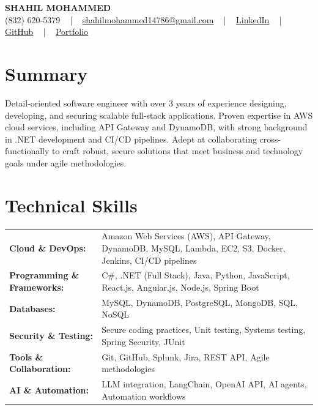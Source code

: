\documentclass[letterpaper,11pt]{article}
\begin{document}
\begin{center}
    {\fontsize{14pt}{12pt}\selectfont \textbf{\MakeUppercase{Shahil Mohammed}}}\\ \vspace{2pt}
    \fontsize{10pt}{12pt}\selectfont (832) 620-5379 ~ | ~ \href{mailto:shahilmohammed14786@gmail.com}{shahilmohammed14786@gmail.com} ~ | ~  
    \href{https://www.linkedin.com/in/shahil-mohammed-9652931a1/}{\color{blue}\underline{LinkedIn}}  ~ | ~ 
    \href{https://github.com/freakbeast14}{\color{blue}\underline{GitHub}} ~ | ~ 
    \href{https://shahil-mohammed.netlify.app/}{\color{blue}\underline{Portfolio}}
    \vspace{-8pt}
\end{center}

\section{Summary}
\fontsize{9pt}{10pt}\selectfont
Detail-oriented software engineer with over 3 years of experience designing, developing, and securing scalable full-stack applications. Proven expertise in AWS cloud services, including API Gateway and DynamoDB, with strong background in .NET development and CI/CD pipelines. Adept at collaborating cross-functionally to craft robust, secure solutions that meet business and technology goals under agile methodologies.
 \vspace{-5pt}
 
\section{Technical Skills}
        \vspace{-14pt}
        \begin{table}[h]
            \fontsize{9pt}{10pt}\selectfont
            \begin{tabular}{p{0.3\linewidth} p{0.7\linewidth}}
                \textbf{Cloud \& DevOps:} & Amazon Web Services (AWS), API Gateway, DynamoDB, MySQL, Lambda, EC2, S3, Docker, Jenkins, CI/CD pipelines \\
                \textbf{Programming \& Frameworks:} & C\#, .NET (Full Stack), Java, Python, JavaScript, React.js, Angular.js, Node.js, Spring Boot \\
                \textbf{Databases:} & MySQL, DynamoDB, PostgreSQL, MongoDB, SQL, NoSQL \\
                \textbf{Security \& Testing:} & Secure coding practices, Unit testing, Systems testing, Spring Security, JUnit \\
                \textbf{Tools \& Collaboration:} & Git, GitHub, Splunk, Jira, REST API, Agile methodologies \\
                \textbf{AI \& Automation:} & LLM integration, LangChain, OpenAI API, AI agents, Automation workflows \\
            \end{tabular}
        \end{table}
 \vspace{-15pt}
 
\end{document}
